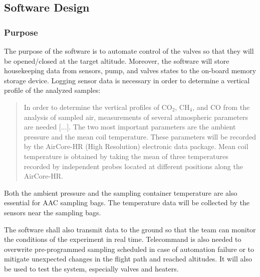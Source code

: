 \pagebreak
\subsection{Software Design}
\subsubsection{Purpose}
The purpose of the software is to automate control of the valves so that they will be opened/closed at the target altitude. Moreover, the software will store housekeeping data from sensors, pump, and valves states to the on-board memory storage device. Logging sensor data is necessary in order to determine a vertical profile of the analyzed samples:

\begin{quote}
In order to determine the vertical profiles of CO$_2$, CH$_4$, and CO from the analysis of sampled air, measurements of several atmospheric parameters are needed [...]. The two most important parameters are the ambient pressure and the mean coil temperature. These parameters will be recorded by the AirCore-HR (High Resolution) electronic data package. Mean coil temperature is obtained by taking the mean of three temperatures recorded by independent probes located at different positions along the AirCore-HR.\cite{Membrive}
\end{quote}

Both the ambient pressure and the sampling container temperature are also essential for AAC sampling bags. The temperature data will be collected by the sensors near the sampling bags.

The software shall also transmit data to the ground so that the team can monitor the conditions of the experiment in real time. Telecommand is also needed to overwrite pre-programmed sampling scheduled in case of automation failure or to mitigate unexpected changes in the flight path and reached altitudes. It will also be used to test the system, especially valves and heaters.\par
